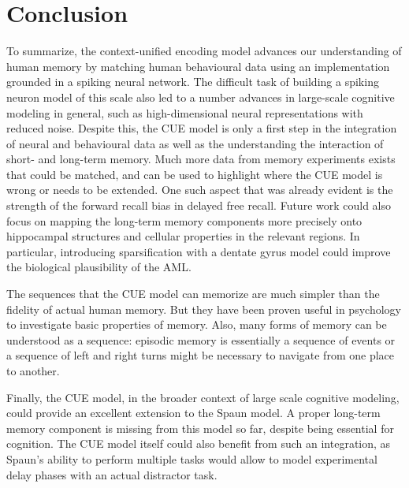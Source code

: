 \chapter{Conclusion}
To summarize, the context-unified encoding model advances our understanding of human memory by matching human behavioural data using an implementation grounded in a spiking neural network.
The difficult task of building a spiking neuron model of this scale also led to a number advances in large-scale cognitive modeling in general, such as high-dimensional neural representations with reduced noise.
Despite this, the CUE model is only a first step in the integration of neural and behavioural data as well as the understanding the interaction of short- and long-term memory.
Much more data from memory experiments exists that could be matched, and can be used to highlight where the CUE model is wrong or needs to be extended.
One such aspect that was already evident is the strength of the forward recall bias in delayed free recall.
Future work could also focus on mapping the long-term memory components more precisely onto hippocampal structures and cellular properties in the relevant regions.
In particular, introducing sparsification with a dentate gyrus model could improve the biological plausibility of the AML\@.

The sequences that the CUE model can memorize are much simpler than the fidelity of actual human memory.
But they have been proven useful in psychology to investigate basic properties of memory.
Also, many forms of memory can be understood as a sequence:
episodic memory is essentially a sequence of events or a sequence of left and right turns might be necessary to navigate from one place to another.

Finally, the CUE model, in the broader context of large scale cognitive modeling, could provide an excellent extension to the Spaun model.
A proper long-term memory component is missing from this model so far, despite being essential for cognition.
The CUE model itself could also benefit from such an integration, as Spaun's ability to perform multiple tasks would allow to model experimental delay phases with an actual distractor task.
